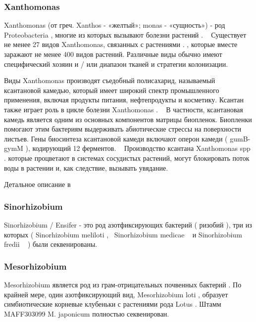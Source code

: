 \documentclass[11pt]{article}
\begin{document}
	\subsubsection{Xanthomonas}
	Xanthomonas (от греч. Xanthos - «желтый»; monas - «сущность») - род Proteobacteria , многие из которых вызывают болезни растений . ~\cite{Xanthomonas_1} Существует не менее 27 видов Xanthomonas, связанных с растениями . , которые вместе заражают не менее 400 видов растений. Различные виды обычно имеют специфический хозяин и / или диапазон тканей и стратегии колонизации. ~\cite{Xanthomonas_1}
	
	Виды Xanthomonas производят съедобный полисахарид, называемый ксантановой камедью, который имеет широкий спектр промышленного применения, включая продукты питания, нефтепродукты и косметику. Ксантан также играет роль в цикле болезни Xanthomonas . ~\cite{Xanthomonas_1} В частности, ксантановая камедь является одним из основных компонентов матрицы биопленок. Биопленки помогают этим бактериям выдерживать абиотические стрессы на поверхности листьев. Гены биосинтеза ксантановой камеди включают оперон камеди ( gumB-gymM ), кодирующий 12 ферментов. ~\cite{Xanthomonas_1} Производство ксантана Xanthomonas spp . которые процветают в системах сосудистых растений, могут блокировать поток воды в растении и, как следствие, вызывать увядание. ~\cite{Xanthomonas_12}
	
	Детальное описание в ~\cite{Xanthomonas_1, Xanthomonas_2,Xanthomonas_3,Xanthomonas_4,Xanthomonas_5,Xanthomonas_6,Xanthomonas_7,Xanthomonas_8,Xanthomonas_9,Xanthomonas_10,Xanthomonas_11,Xanthomonas_12,Xanthomonas_13,Xanthomonas_14,Xanthomonas_15,Xanthomonas_16,Xanthomonas_17,Xanthomonas_18,Xanthomonas_19,Xanthomonas_20,Xanthomonas_21,Xanthomonas_22}
	
	\subsubsection{Sinorhizobium}
	Sinorhizobium / Ensifer - это род азотфиксирующих бактерий ( ризобий ), три из которых ( Sinorhizobium meliloti ,~\cite{Sinorhizobium_21,Sinorhizobium_22} Sinorhizobium medicae ~\cite{Sinorhizobium_23} и Sinorhizobium fredii ~\cite{Sinorhizobium_24, Sinorhizobium_25} ) были секвенированы.
	
	\subsubsection{Mesorhizobium}
	Mesorhizobium является род из грам-отрицательных почвенных бактерий . По крайней мере, один азотфиксирующий вид, Mesorhizobium loti , образует симбиотические корневые клубеньки с растениями рода Lotus . Штамм MAFF303099 M. japonicum полностью секвенирован. ~\cite{Mesorhizobium_1}
	
\end{document}
